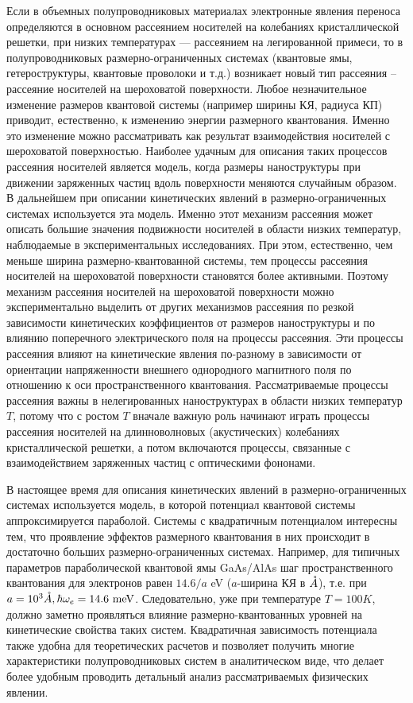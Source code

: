 Если в объемных полупроводниковых материалах электронные явления переноса определяются в основном рассеянием носителей на колебаниях кристаллической решетки, при низких температурах --- рассеянием на легированной примеси, то в полупроводниковых размерно-ограниченных системах (квантовые ямы, гетероструктуры, квантовые проволоки и т.д.) возникает новый тип рассеяния – рассеяние носителей на шероховатой поверхности. Любое незначительное изменение размеров квантовой системы (например ширины КЯ, радиуса КП) приводит, естественно, к изменению энергии размерного квантования. Именно это изменение можно рассматривать как результат взаимодействия носителей с шероховатой поверхностью. Наиболее удачным для описания таких процессов рассеяния носителей является модель, когда размеры наноструктуры при движении заряженных частиц вдоль поверхности меняются случайным образом. В дальнейшем при описании кинетических явлений в размерно-ограниченных системах используется эта модель. Именно этот механизм рассеяния может описать большие значения подвижности носителей в области низких температур, наблюдаемые в экспериментальных исследованиях. При этом, естественно, чем меньше ширина размерно-квантованной системы, тем процессы рассеяния носителей на шероховатой поверхности становятся более активными. Поэтому механизм рассеяния носителей на шероховатой поверхности можно экспериментально выделить от других механизмов рассеяния по резкой зависимости кинетических коэффициентов от размеров наноструктуры и по влиянию поперечного электрического поля на процессы рассеяния. Эти процессы рассеяния влияют на кинетические явления по-разному в зависимости от ориентации напряженности внешнего однородного магнитного поля по отношению к оси пространственного квантования. Рассматриваемые процессы рассеяния важны в нелегированных наноструктурах в области низких температур $T$, потому что с ростом $T$ вначале важную роль начинают играть процессы рассеяния носителей на длинноволновых (акустических) колебаниях кристаллической решетки, а потом включаются процессы, связанные с взаимодействием заряженных частиц с оптическими фононами.

В настоящее время для описания кинетических явлений в размерно-ограниченных системах используется модель, в которой потенциал квантовой системы аппроксимируется параболой. Системы с квадратичным потенциалом интересны тем, что проявление эффектов размерного квантования в них происходит в достаточно больших размерно-ограниченных системах. Например, для типичных параметров параболической квантовой ямы GaAs/AlAs шаг пространственного квантования для электронов равен $14.6/a$ eV ($a$-ширина КЯ в $\AA$), т.е. при $a=10^3 \AA, \hbar\omega_e = 14.6 \text{ meV}$. Следовательно, уже при температуре $T=100 K$, должно заметно проявляться влияние размерно-квантованных уровней на кинетические свойства таких систем. Квадратичная зависимость потенциала также удобна для теоретических расчетов и позволяет получить многие характеристики полупроводниковых систем в аналитическом виде, что делает более удобным проводить детальный анализ рассматриваемых физических явлении.
\fi

